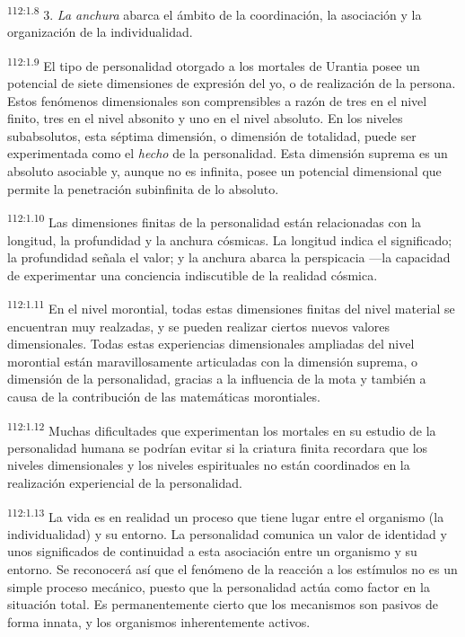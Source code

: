 \par
\textsuperscript{112:1.8} 3. \textit{La anchura} abarca el ámbito de la coordinación, la asociación y la organización de la individualidad.

\par
\textsuperscript{112:1.9} El tipo de personalidad otorgado a los mortales de Urantia posee un potencial de siete dimensiones de expresión del yo, o de realización de la persona. Estos fenómenos dimensionales son comprensibles a razón de tres en el nivel finito, tres en el nivel absonito y uno en el nivel absoluto. En los niveles subabsolutos, esta séptima dimensión, o dimensión de totalidad, puede ser experimentada como el \textit{hecho} de la personalidad. Esta dimensión suprema es un absoluto asociable y, aunque no es infinita, posee un potencial dimensional que permite la penetración subinfinita de lo absoluto.

\par
\textsuperscript{112:1.10} Las dimensiones finitas de la personalidad están relacionadas con la longitud, la profundidad y la anchura cósmicas. La longitud indica el significado; la profundidad señala el valor; y la anchura abarca la perspicacia ---la capacidad de experimentar una conciencia indiscutible de la realidad cósmica.

\par
\textsuperscript{112:1.11} En el nivel morontial, todas estas dimensiones finitas del nivel material se encuentran muy realzadas, y se pueden realizar ciertos nuevos valores dimensionales. Todas estas experiencias dimensionales ampliadas del nivel morontial están maravillosamente articuladas con la dimensión suprema, o dimensión de la personalidad, gracias a la influencia de la mota y también a causa de la contribución de las matemáticas morontiales.

\par
\textsuperscript{112:1.12} Muchas dificultades que experimentan los mortales en su estudio de la personalidad humana se podrían evitar si la criatura finita recordara que los niveles dimensionales y los niveles espirituales no están coordinados en la realización experiencial de la personalidad.

\par
\textsuperscript{112:1.13} La vida es en realidad un proceso que tiene lugar entre el organismo (la individualidad) y su entorno. La personalidad comunica un valor de identidad y unos significados de continuidad a esta asociación entre un organismo y su entorno. Se reconocerá así que el fenómeno de la reacción a los estímulos no es un simple proceso mecánico, puesto que la personalidad actúa como factor en la situación total. Es permanentemente cierto que los mecanismos son pasivos de forma innata, y los organismos inherentemente activos.

